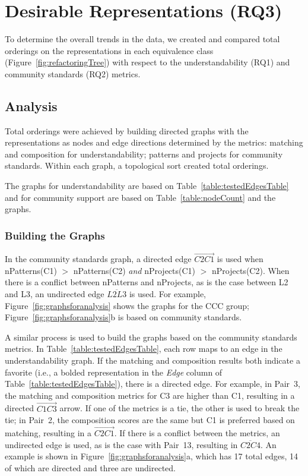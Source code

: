 

\section{Desirable Representations (RQ3)}
\label{sec:rq3}
To determine the overall trends in the data, we created and compared total orderings on the representations in each equivalence class (Figure~\ref{fig:refactoringTree})  with respect to the understandability (RQ1) and community standards (RQ2)   metrics.

\subsection{Analysis}
Total orderings were achieved by building directed graphs with the representations as nodes and edge directions determined by the metrics: matching and composition for understandability;  patterns and projects for community standards. Within each graph, a topological sort created total  orderings.

The graphs for understandability are based on Table~\ref{table:testedEdgesTable} and for community support are based on Table~\ref{table:nodeCount} and the graphs. 



\subsubsection{Building the Graphs}
In the community standards graph, a directed edge  $\overrightarrow{C2  C1}$ is used when  nPatterns(C1) $>$ nPatterns(C2) \emph{and}  nProjects(C1) $>$ nProjects(C2).
When there is a conflict between nPatterns and nProjects, as is the case between L2 and L3, 
an undirected edge $\overline{L2L3}$ is used. %
For example, Figure~\ref{fig:graphsforanalysis} shows the graphs for  the CCC group; Figure~\ref{fig:graphsforanalysis}b is based  on community standards. 

A similar process is used to build the graphs based on the community standards metrics. 
In Table~\ref{table:testedEdgesTable}, each row maps to an edge in the understandability graph. 
If the matching and composition results both indicate a favorite (i.e., a bolded representation in the {\em Edge} column of Table~\ref{table:testedEdgesTable}), there is a directed edge. For example, in Pair~3, the matching and composition metrics for C3 are higher than C1, resulting in a directed $\overrightarrow{C1  C3}$ arrow. If one of the metrics is a tie, the other is used to break the tie; in Pair~2, the composition scores are the same but C1 is preferred based on matching, resulting in a $\overrightarrow{C2  C1}$. If there is a conflict between the metrics, an undirected edge is used, as is the case with Pair~13, resulting in $\overline{C2 C4}$.
An example is shown in Figure~\ref{fig:graphsforanalysis}a, which has 17 total edges, 14 of which are directed and three are undirected. 

